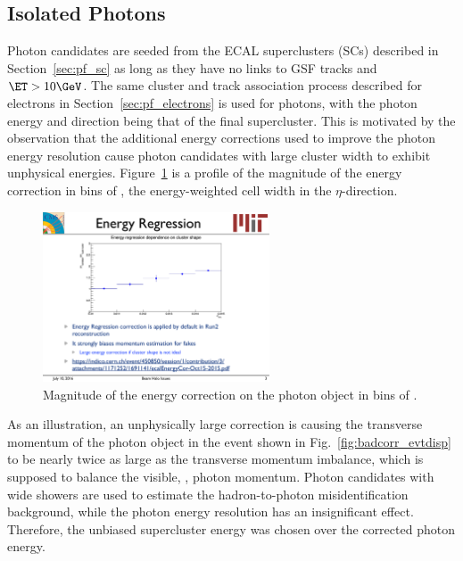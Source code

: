 \subsection{Isolated Photons}
\label{sec:pf_photons}

Photon candidates are seeded from the ECAL superclusters (SCs) described in Section~\ref{sec:pf_sc} as long as they have no links to GSF tracks and $\ET > 10\GeV$. 
The same cluster and track association process described for electrons in Section~\ref{sec:pf_electrons} is used for photons, with the photon energy and direction being that of the final supercluster.
This is motivated by the observation that the additional energy corrections used to improve the photon energy resolution cause photon candidates with large cluster width to exhibit unphysical energies. 
Figure~\ref{fig:corr_vs_sieie} is a profile of the magnitude of the energy correction in bins of \sieie, the energy-weighted cell width in the $\eta$-direction.

\begin{figure}[htbp]
  \begin{center}
    \includegraphics[width=0.6\textwidth]{Reconstruction/Figures/corr_vs_sieie.pdf}
    \caption{
      Magnitude of the energy correction on the photon object in bins of \sieie.
    }
    \label{fig:corr_vs_sieie}
  \end{center}
\end{figure}

As an illustration, an unphysically large correction is causing the transverse momentum of the photon object in the event shown in Fig.~\ref{fig:badcorr_evtdisp} to be nearly twice as large as the transverse momentum imbalance, which is supposed to balance the visible, \ie, photon momentum. 
Photon candidates with wide showers are used to estimate the hadron-to-photon misidentification background, while the photon energy resolution has an insignificant effect. 
Therefore, the unbiased supercluster energy was chosen over the corrected photon energy.

